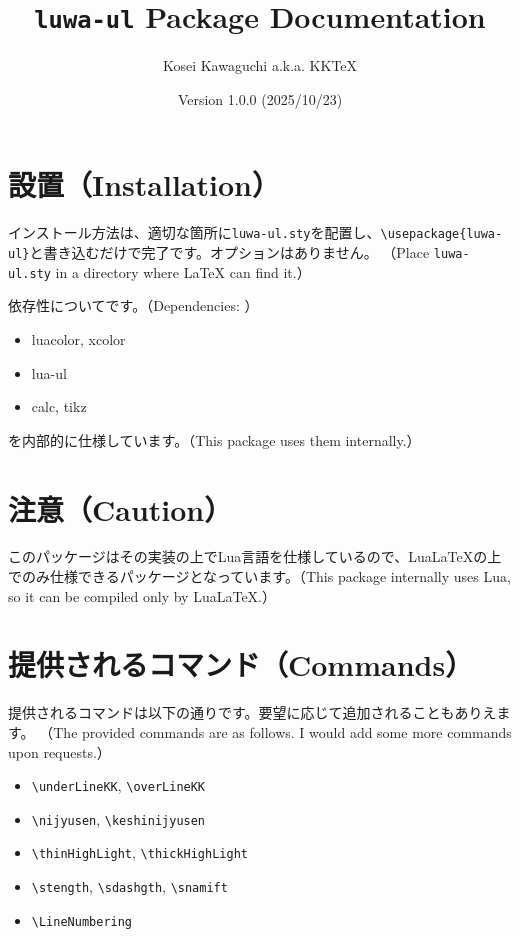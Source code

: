 \documentclass[luatex,fontsize=8pt,paper=b5,twoside]{jlreq}%
\title{\texttt{luwa-ul} Package Documentation}
\author{Kosei Kawaguchi a.k.a. KKTeX}
\date{Version 1.0.0 (2025/10/23)}
\begin{document}
\begin{titlepage}
  \maketitle
\end{titlepage}
\newpage
\tableofcontents
\newpage

\section{設置（Installation）}
インストール方法は、適切な箇所に\texttt{luwa-ul.sty}を配置し、\verb|\usepackage{luwa-ul}|と書き込むだけで完了です。オプションはありません。
（Place \texttt{luwa-ul.sty} in a directory where LaTeX can find it.）

依存性についてです。（Dependencies: ）

\begin{itemize}
  \item luacolor, xcolor
  \item lua-ul
  \item calc, tikz
\end{itemize}

\noindent を内部的に仕様しています。（This package uses them internally.）

\section{注意（Caution）}
このパッケージはその実装の上でLua言語を仕様しているので、LuaLaTeXの上でのみ仕様できるパッケージとなっています。（This package internally uses Lua, so it can be compiled only by LuaLaTeX.）

\section{提供されるコマンド（Commands）}
提供されるコマンドは以下の通りです。要望に応じて追加されることもありえます。
（The provided commands are as follows. I would add some more commands upon requests.）

\begin{itemize}
  \item \verb|\underLineKK|, \verb|\overLineKK|
  \item \verb|\nijyusen|, \verb|\keshinijyusen|
  \item \verb|\thinHighLight|, \verb|\thickHighLight|
  \item \verb|\stength|, \verb|\sdashgth|, \verb|\snamift|
  \item \verb|\LineNumbering|
\end{itemize}
\end{document}
